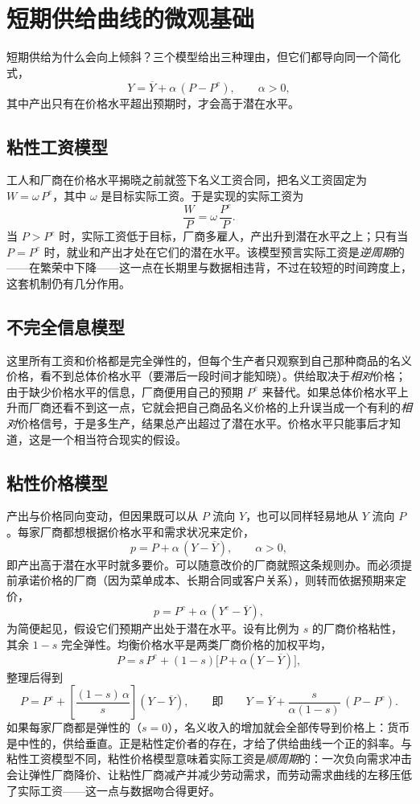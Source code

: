 \section{短期供给曲线的微观基础}

短期供给为什么会向上倾斜？三个模型给出三种理由，但它们都导向同一个简化式，
\[
Y = \overline{Y} + \alpha\,(P - P^{e}), \qquad \alpha>0,
\]
其中产出只有在价格水平超出预期时，才会高于潜在水平。

\subsection{粘性工资模型}

工人和厂商在价格水平揭晓之前就签下名义工资合同，把名义工资固定为 $W=\omega\, P^{e}$，其中 $\omega$ 是目标实际工资。于是实现的实际工资为
\[
\frac{W}{P} = \omega\,\frac{P^{e}}{P}.
\]
当 $P>P^{e}$ 时，实际工资低于目标，厂商多雇人，产出升到潜在水平之上；只有当 $P=P^{e}$ 时，就业和产出才处在它们的潜在水平。该模型预言实际工资是\emph{逆周期}的——在繁荣中下降——这一点在长期里与数据相违背，不过在较短的时间跨度上，这套机制仍有几分作用。

\subsection{不完全信息模型}

这里所有工资和价格都是完全弹性的，但每个生产者只观察到自己那种商品的名义价格，看不到总体价格水平（要滞后一段时间才能知晓）。供给取决于\emph{相对}价格；由于缺少价格水平的信息，厂商便用自己的预期 $P^{e}$ 来替代。如果总体价格水平上升而厂商还看不到这一点，它就会把自己商品名义价格的上升误当成一个有利的\emph{相对}价格信号，于是多生产，结果总产出超过了潜在水平。价格水平只能事后才知道，这是一个相当符合现实的假设。

\subsection{粘性价格模型}

产出与价格同向变动，但因果既可以从 $P$ 流向 $Y$，也可以同样轻易地从 $Y$ 流向 $P$。每家厂商都想根据价格水平和需求状况来定价，
\[
p = P + \alpha\,(Y - \overline{Y}), \qquad \alpha>0,
\]
即产出高于潜在水平时就多要价。可以随意改价的厂商就照这条规则办。而必须提前承诺价格的厂商（因为菜单成本、长期合同或客户关系），则转而依据预期来定价，
\[
p = P^{e} + \alpha\,(Y^{e} - \overline{Y}),
\]
为简便起见，假设它们预期产出处于潜在水平。设有比例为 $s$ 的厂商价格粘性，其余 $1-s$ 完全弹性。均衡价格水平是两类厂商价格的加权平均，
\[
P = s\,P^{e} + (1-s)\big[P + \alpha(Y-\overline{Y})\big],
\]
整理后得到
\[
P = P^{e} + \left[\frac{(1-s)\,\alpha}{s}\right](Y-\overline{Y}),
\qquad\text{即}\qquad
Y = \overline{Y} + \frac{s}{\alpha(1-s)}\,(P-P^{e}).
\]
如果每家厂商都是弹性的（$s=0$），名义收入的增加就会全部传导到价格上：货币是中性的，供给垂直。正是粘性定价者的存在，才给了供给曲线一个正的斜率。与粘性工资模型不同，粘性价格模型意味着实际工资是\emph{顺周期}的：一次负向需求冲击会让弹性厂商降价、让粘性厂商减产并减少劳动需求，而劳动需求曲线的左移压低了实际工资——这一点与数据吻合得更好。
